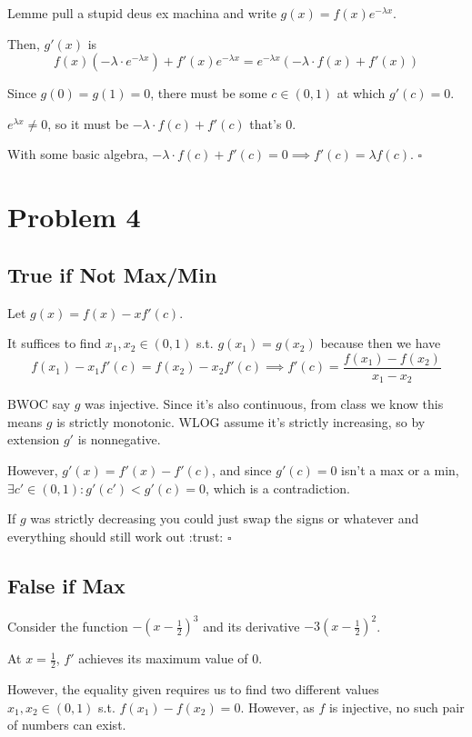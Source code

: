 \documentclass[12pt]{article}
\begin{document}
Lemme pull a stupid deus ex machina and write $g(x)=f(x)e^{-\lambda x}$.

Then, $g'(x)$ is
\[f(x)\left(-\lambda \cdot e^{-\lambda x}\right)+f'(x)e^{-\lambda x}=e^{-\lambda x}(-\lambda \cdot f(x)+f'(x))\]

Since $g(0)=g(1)=0$, there must be some $c \in (0, 1)$ at which $g'(c)=0$.

$e^{\lambda x} \ne 0$, so it must be $-\lambda \cdot f(c)+f'(c)$ that's $0$.

With some basic algebra, $-\lambda \cdot f(c)+f'(c)=0 \implies f'(c)=\lambda f(c)$. $\square$

\section{Problem 4}

\subsection{True if Not Max/Min}

Let $g(x)=f(x)-xf'(c)$.

It suffices to find $x_1, x_2 \in (0, 1)$ s.t. $g(x_1)=g(x_2)$ because then we have
\[f(x_1)-x_1f'(c)=f(x_2)-x_2f'(c) \implies f'(c)=\frac{f(x_1)-f(x_2)}{x_1-x_2}\]

BWOC say $g$ was injective.
Since it's also continuous, from class we know this means
$g$ is strictly monotonic.
WLOG assume it's strictly increasing, so by extension $g'$ is nonnegative.

However, $g'(x)=f'(x)-f'(c)$, and since $g'(c)=0$ isn't a max or a min,
$\exists c' \in (0, 1): g'(c') < g'(c)=0$, which is a contradiction.

If $g$ was strictly decreasing you could just swap the signs or
whatever and everything should still work out :trust: $\square$

\subsection{False if Max}

Consider the function $-\left(x-\frac{1}{2}\right)^3$
and its derivative $-3\left(x-\frac{1}{2}\right)^2$.

At $x=\frac{1}{2}$, $f'$ achieves its maximum value of $0$.

However, the equality given requires us to find two different values
$x_1, x_2 \in (0, 1)$ s.t. $f(x_1)-f(x_2)=0$.
However, as $f$ is injective, no such pair of numbers can exist.
\end{document}
